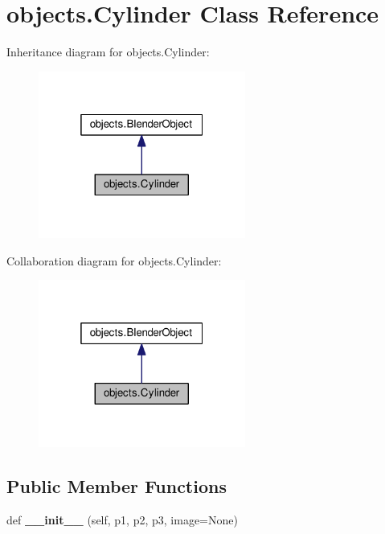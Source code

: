 \hypertarget{classobjects_1_1Cylinder}{}\section{objects.\+Cylinder Class Reference}
\label{classobjects_1_1Cylinder}


Inheritance diagram for objects.\+Cylinder\+:\nopagebreak
\begin{figure}[H]
\begin{center}
\leavevmode
\includegraphics[width=193pt]{classobjects_1_1Cylinder__inherit__graph}
\end{center}
\end{figure}


Collaboration diagram for objects.\+Cylinder\+:\nopagebreak
\begin{figure}[H]
\begin{center}
\leavevmode
\includegraphics[width=193pt]{classobjects_1_1Cylinder__coll__graph}
\end{center}
\end{figure}
\subsection*{Public Member Functions}
\begin{DoxyCompactItemize}
\item 
def {\bfseries \+\_\+\+\_\+init\+\_\+\+\_\+} (self, p1, p2, p3, image=None)\hypertarget{classobjects_1_1Cylinder_acc80b3ae64195534aa7d1f8d49d50ced}{}\label{classobjects_1_1Cylinder_acc80b3ae64195534aa7d1f8d49d50ced}

\end{DoxyCompactItemize}
